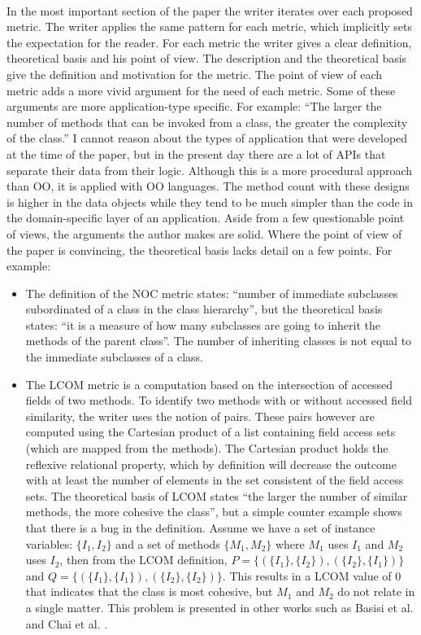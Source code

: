 \paragraph{}
In the most important section of the paper the writer iterates over each proposed metric. The writer applies the
same pattern for each metric, which implicitly sets the expectation for the reader. For each metric the writer gives a
clear definition, theoretical basis and his point of view. The description and the theoretical basis give the definition and
motivation for the metric. The point of view of each metric adds a more vivid argument for the need of each metric.
Some of these arguments are more application-type specific. For example: ``The larger the number of methods that can be
invoked from a class, the greater the complexity of the class.'' I cannot reason about the types of application that were
developed at the time of the paper, but in the present day there are a lot of APIs that separate their data from their
logic. Although this is a more procedural approach than OO, it is applied with OO languages. The method count
with these designs is higher in the data objects while they tend to be much simpler than the code in the domain-specific
layer of an application. Aside from a few questionable point of views, the arguments the author makes are solid.
Where the point of view of the paper is convincing, the theoretical basis lacks detail on a few points. For example:

\begin{itemize}
\item
The definition of the NOC metric states: ``number of immediate subclasses subordinated of a class in the class
hierarchy'', but the theoretical basis states: ``it is a measure of how many subclasses are going to inherit
the methods of the parent class''. The number of inheriting classes is not equal to the immediate subclasses of a
class.
\item
The LCOM metric is a computation based on the intersection of accessed fields of two methods. To identify two
methods with or without accessed field similarity, the writer uses the notion of pairs. These pairs however are
computed using the Cartesian product of a list containing field access sets (which are mapped from the
methods). The Cartesian product holds the reflexive relational property, which by definition will decrease
the outcome with at least the number of elements in the set consistent of the field access sets.
The theoretical basis of LCOM states ``the larger the number of similar methods, the more cohesive the class'',
but a simple counter example shows that there is a bug in the definition. Assume we have a set of instance
variables: $\{I_1, I_2\}$ and a set of methods $\{M_1, M_2\}$ where $M_1$ uses $I_1$ and $M_2$ uses $I_2$, then from
the LCOM definition, $P = \{( \{I_1\}, \{I_2\} ), ( \{I_2\}, \{I_1\} ) \}$ and
$Q = \{( \{I_1\}, \{I_1\} ), ( \{I_2\}, \{I_2\} ) \}$. This results in a LCOM value of $0$ that indicates that
the class is most cohesive, but $M_1$ and $M_2$ do not relate in a single matter. This problem is presented in other
works such as Basisi et al. \autocite{BASILI} and Chai et al. \autocite{CHAE}.
\end{itemize}

